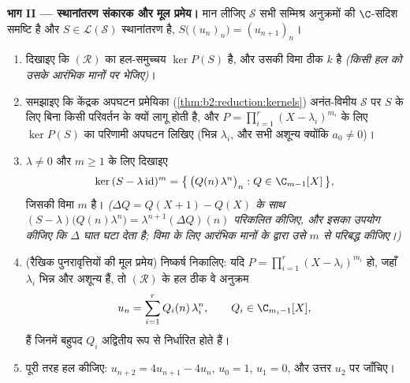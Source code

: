 \begin{problem}[{सप्ताहांत समस्या --- रैखिक पुनरावृत्तियों की
मूल प्रमेय}]
\medskip
\noindent\textbf{भाग II --- स्थानांतरण संकारक और मूल प्रमेय।} मान
लीजिए $\mathcal{S}$ सभी सम्मिश्र अनुक्रमों की $\C$-सदिश समष्टि है और $S \in
\mathcal{L}(\mathcal{S})$
स्थानांतरण है, $S\bigl((u_n)_n\bigr) =
(u_{n+1})_n$।
\begin{enumerate}[resume]
  \item दिखाइए कि $(\mathcal R)$ का हल-समुच्चय $\ker
        P(S)$ है, और उसकी विमा ठीक $k$ है
        \emph{(किसी हल को उसके आरंभिक मानों पर भेजिए)}।
  \item समझाइए कि केंद्रक अपघटन प्रमेयिका (\cref{thm:b2:reduction:kernels}) अनंत-विमीय $\mathcal{S}$ पर $S$
        के लिए बिना किसी परिवर्तन के क्यों लागू होती है, और $P = \prod_{i=1}^{r}(X - \lambda_i)^{m_i}$ के लिए
        $\ker P(S)$ का परिणामी अपघटन लिखिए (भिन्न $\lambda_i$, और सभी अशून्य क्योंकि
        $a_0 \neq 0$)।
  \item $\lambda \neq 0$ और $m \geq 1$ के लिए दिखाइए
        \[
        \ker\,(S - \lambda\,\mathrm{id})^m
        = \bigl\{\,\bigl(Q(n)\,\lambda^n\bigr)_n : Q \in
        \C_{m-1}[X]\,\bigr\},
        \]
        जिसकी विमा $m$ है। \emph{($\Delta Q = Q(X + 1) -
        Q(X)$ के साथ $(S -
        \lambda)\bigl(Q(n)\lambda^n\bigr) =
        \lambda^{n+1}(\Delta Q)(n)$ परिकलित कीजिए, और
        इसका उपयोग कीजिए कि $\Delta$ घात घटा देता है; विमा के लिए आरंभिक
        मानों के द्वारा उसे $m$ से परिबद्ध कीजिए।)}
  \item (रैखिक पुनरावृत्तियों की मूल प्रमेय) निष्कर्ष निकालिए: यदि
        $P = \prod_{i=1}^{r}(X - \lambda_i)^{m_i}$ हो, जहाँ $\lambda_i$ भिन्न और अशून्य हैं, तो $(\mathcal R)$ के हल ठीक वे
        अनुक्रम
        \[
        u_n = \sum_{i=1}^{r} Q_i(n)\,\lambda_i^n,
        \qquad Q_i \in \C_{m_i - 1}[X],
        \]
        हैं जिनमें बहुपद $Q_i$ अद्वितीय रूप से निर्धारित होते हैं।
  \item पूरी तरह हल कीजिए: $u_{n+2} = 4u_{n+1} - 4u_n$, $u_0 =
        1$, $u_1 = 0$, और उत्तर $u_2$ पर जाँचिए।
\end{enumerate}


\end{problem}
